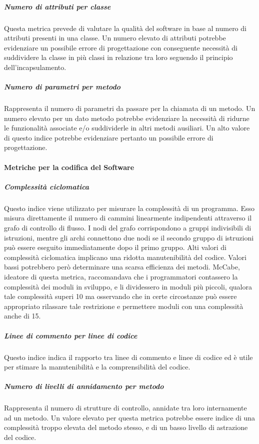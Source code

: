 \subparagraph{Numero di attributi per classe}
Questa metrica prevede di valutare la qualità del software in base al numero di attributi presenti in una classe.
Un numero elevato di attributi potrebbe evidenziare un possibile errore di progettazione con conseguente necessità di suddividere la classe in più classi in relazione tra loro seguendo il principio dell'incapsulamento.

\subparagraph{Numero di parametri per metodo}
Rappresenta il numero di parametri da passare per la chiamata di un metodo.
Un numero elevato per un dato metodo potrebbe evidenziare la necessità di ridurne le funzionalità associate e/o suddividerle in altri metodi ausiliari.
Un alto valore di questo indice potrebbe evidenziare pertanto un possibile errore di progettazione.

\paragraph{Metriche per la codifica del Software}

\subparagraph{Complessità ciclomatica}
Questo indice viene utilizzato per misurare la complessità di un programma. Esso misura direttamente il numero di cammini linearmente indipendenti attraverso il grafo di controllo di flusso. I nodi del grafo corrispondono a gruppi indivisibili di istruzioni, mentre gli archi connettono due nodi se il secondo gruppo di istruzioni può essere eseguito immediatamente dopo il primo gruppo.
Alti valori di complessità ciclomatica implicano una ridotta manutenibilità del codice. Valori bassi potrebbero però determinare  una scarsa efficienza dei metodi. McCabe, ideatore di questa metrica, raccomandava che i programmatori contassero la complessità dei moduli in sviluppo, e li dividessero in moduli più piccoli, qualora tale complessità superi 10 ma osservando che in certe circostanze può essere appropriato rilassare tale restrizione e permettere moduli con una complessità anche di 15.

\subparagraph{Linee di commento per linee di codice}
Questo indice indica il rapporto tra linee di commento e linee di codice ed è utile per stimare la manutenibilità e la comprensibilità del codice. 

\subparagraph{Numero di livelli di annidamento per metodo}
Rappresenta il numero di strutture di controllo, annidate tra loro internamente ad un metodo.
Un valore elevato per questa metrica potrebbe essere indice di una complessità troppo elevata del metodo stesso, e di un basso livello di astrazione del codice.



